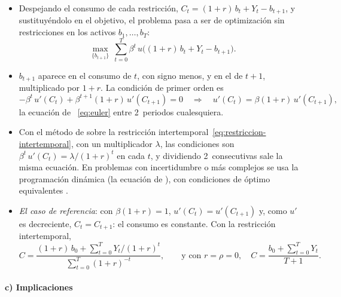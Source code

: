 \documentclass[11pt]{article}
\begin{document}
\begin{itemize}
\item Despejando el consumo de cada restricción, $C_t=(1+r)\,b_t+Y_t-b_{t+1}$, y sustituyéndolo en el objetivo, el problema pasa a ser de optimización sin restricciones en los activos $b_1,\dots,b_{T}$:
  \begin{equation*}
  \max_{\{b_{t+1}\}}\ \sum_{t=0}^{T}\beta^t\,u\big((1+r)\,b_t+Y_t-b_{t+1}\big).
  \end{equation*}
\item $b_{t+1}$ aparece en el consumo de $t$, con signo menos, y en el de $t+1$, multiplicado por $1+r$. La condición de primer orden es
  \begin{equation*}
  -\beta^t\,u'(C_t)+\beta^{t+1}(1+r)\,u'(C_{t+1})=0\quad\Longrightarrow\quad u'(C_t)=\beta(1+r)\,u'(C_{t+1}),
  \end{equation*}
  la ecuación de ~\eqref{eq:euler} entre 2~periodos cualesquiera.
\item Con el método de  sobre la restricción intertemporal~\eqref{eq:restriccion-intertemporal}, con un multiplicador $\lambda$, las condiciones son $\beta^t\,u'(C_t)=\lambda/(1+r)^t$ en cada $t$, y dividiendo 2~consecutivas sale la misma ecuación. En problemas con incertidumbre o más complejos se usa la programación dinámica (la ecuación de ), con condiciones de óptimo equivalentes .
\item \emph{El caso de referencia}: con $\beta(1+r)=1$, $u'(C_t)=u'(C_{t+1})$ y, como $u'$ es decreciente, $C_t=C_{t+1}$: el consumo es constante. Con la restricción intertemporal,
  \begin{equation*}
  C=\frac{(1+r)\,b_0+\sum_{t=0}^{T}Y_t/(1+r)^t}{\sum_{t=0}^{T}(1+r)^{-t}},\qquad\text{y con }r=\rho=0,\quad C=\frac{b_0+\sum_{t=0}^{T}Y_t}{T+1}.
  \end{equation*}
  \findemo
\end{itemize}

\paragraph{c) Implicaciones}
\end{document}
